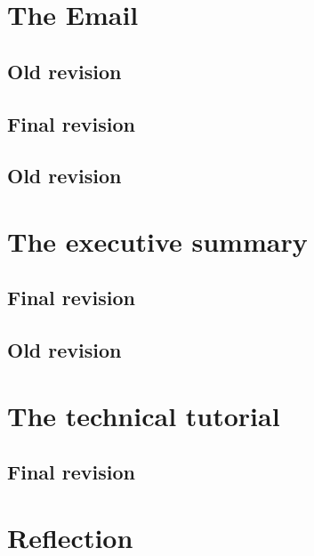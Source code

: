 \documentclass[11pt,english]{article}
\begin{document}
	\newpage
	\tableofcontents

	\newpage
	\section{The Email}
	\subsection{Old revision}
	

	\newpage
	\subsection{Final revision}

	\newpage
	\subsection{Old revision}
	\section{The executive summary}
	

	\newpage
	\subsection{Final revision}

	\newpage
	\subsection{Old revision}
	\section{The technical tutorial}
	

	\newpage
	\subsection{Final revision}

	\newpage
	\section{Reflection}
\end{document}

